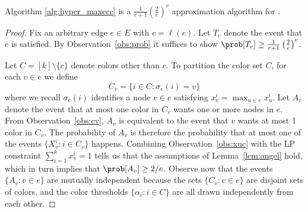 \begin{theorem}
    Algorithm \ref{alg:hyper_maxecc} is a $\frac{1}{r+1} \left(\frac{2}{e}\right)^r$ approximation algorithm for \hypermaxecc{}.
\end{theorem}
\begin{proof}
Fix an arbitrary edge $e \in E$ with $c = \ell(e)$. Let $T_e$ denote the event that $e$ is satisfied. 
By Observation~\ref{obs:prob} it suffices to show $\prob[T_e] \geq \frac{1}{r+1} \left(\frac2e\right)^r$. 

Let $C = [k]\setminus \{c\}$ denote colors other than $c$. 
To partition the color set $C$, for each $v \in e$ we define
\begin{equation*}
    C_v = \{i \in C \colon \sigma_e(i) = v\}
\end{equation*}
where we recall $\sigma_e(i)$ identifies a node $v \in e$ satisfying $x_v^i = \max_{u \in e} x_u^i$.
Let $A_v$ denote the event that at most one color in $C_v$ wants one or more nodes in $e$. From Observation~\ref{obs:cv}, $A_v$ is equivalent to the event that  $v$ wants at most 1 color in $C_v$. The probability of $A_v$ is therefore the probability that at most one of the events $\{X_v^i \colon i \in C_v \}$ happens. Combining Observation~\ref{obs:xuc} with the LP constraint $\sum_{i = 1}^k x_v^i = 1$ tells us that the assumptions of Lemma~\ref{lem:angel} hold, which in turn implies that $\prob[A_v] \geq 2/e$.
Observe now that the events $\{A_v \colon v \in e \}$ are mutually independent because the sets $\{C_v \colon v \in e\}$ are disjoint sets of colors, and the color thresholds $\{\alpha_i \colon i \in C\}$ are all drawn independently from each other. 


\end{proof}
